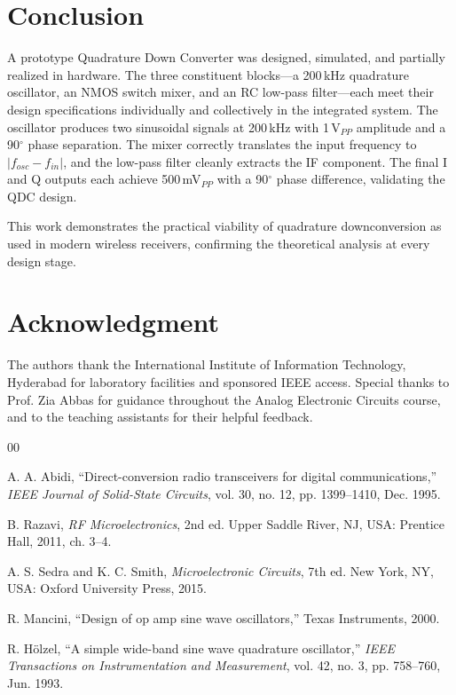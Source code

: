 \documentclass[conference]{IEEEtran}
\begin{document}
\section{Conclusion}

A prototype Quadrature Down Converter was designed, simulated, and partially realized in hardware. The three constituent blocks—a 200\,kHz quadrature oscillator, an NMOS switch mixer, and an RC low-pass filter—each meet their design specifications individually and collectively in the integrated system. The oscillator produces two sinusoidal signals at 200\,kHz with 1\,V$_{PP}$ amplitude and a 90$^\circ$ phase separation. The mixer correctly translates the input frequency to $|f_{osc} - f_{in}|$, and the low-pass filter cleanly extracts the IF component. The final I and Q outputs each achieve 500\,mV$_{PP}$ with a 90$^\circ$ phase difference, validating the QDC design.

This work demonstrates the practical viability of quadrature downconversion as used in modern wireless receivers, confirming the theoretical analysis at every design stage.

\section*{Acknowledgment}

The authors thank the International Institute of Information Technology, Hyderabad for laboratory facilities and sponsored IEEE access. Special thanks to Prof. Zia Abbas for guidance throughout the Analog Electronic Circuits course, and to the teaching assistants for their helpful feedback.

\begin{thebibliography}{00}

A. A. Abidi, ``Direct-conversion radio transceivers for digital communications,'' \textit{IEEE Journal of Solid-State Circuits}, vol. 30, no. 12, pp. 1399--1410, Dec. 1995.

B. Razavi, \textit{RF Microelectronics}, 2nd ed. Upper Saddle River, NJ, USA: Prentice Hall, 2011, ch. 3--4.

A. S. Sedra and K. C. Smith, \textit{Microelectronic Circuits}, 7th ed. New York, NY, USA: Oxford University Press, 2015.

R. Mancini, ``Design of op amp sine wave oscillators,'' Texas Instruments, 2000.

R. H\"{o}lzel, ``A simple wide-band sine wave quadrature oscillator,'' \textit{IEEE Transactions on Instrumentation and Measurement}, vol. 42, no. 3, pp. 758--760, Jun. 1993.

\end{thebibliography}
\end{document}
